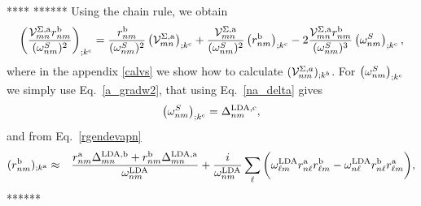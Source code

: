 \documentclass{article}
\begin{document}
****
******
Using the chain rule, we obtain
\begin{eqnarray}\label{chrn1}
\left(
\frac{{\mathbf{\cal V}}^{\Sigma,\mathrm{a}}_{mn}r^{\mathrm{b}}_{nm}}{(\omega^S_{nm})^2}
\right)_{;k^{\mathrm{c}}}
=
\frac{r^{\mathrm{b}}_{nm}}{(\omega^S_{nm})^2}
\left(
{\mathbf{\cal V}} ^{\Sigma,\mathrm{a}}_{mn}
\right)_{;k^{\mathrm{c}}}
+
\frac{{\mathbf{\cal V}}^{\Sigma,\mathrm{a}}_{mn}}{(\omega^S_{nm})^2}
\left(
r^{\mathrm{b}}_{nm}
\right)_{;k^{\mathrm{c}}}
-
2\frac{{\mathbf{\cal V}}^{\Sigma,\mathrm{a}}_{mn}r^{\mathrm{b}}_{nm}}{(\omega^S_{nm})^3}
\left(
\omega^S_{nm}
\right)_{;k^{\mathrm{c}}}
,
\end{eqnarray}
where in the appendix \ref{calvs} 
we show how to calculate $({\mathbf{\cal V}}^{\Sigma,a}_{nm})_{;k^b}$.
For 
$\left(\omega^S_{nm}\right)_{;k^{\mathrm{c}}}$
 we simply use
Eq.~\eqref{a_gradw2}, that using Eq.~\eqref{na_delta} gives
\begin{equation}\label{eli.1}
\left(\omega^S_{nm}\right)_{;k^{\mathrm{c}}}
=\Delta^{\mathrm{LDA},\mathrm{c}}_{nm}
,
\end{equation}
and from Eq.~\eqref{rgendevapn}
\begin{eqnarray}\label{eli.2}
(r^{\mathrm{b}}_{nm})_{;k^{\mathrm{a}}}
&\approx&
\frac{
r^{\mathrm{a}}_{nm}
\Delta^{\mathrm{LDA},\mathrm{b}}_{mn}
+r^{\mathrm{b}}_{nm}
\Delta^{\mathrm{LDA},\mathrm{a}}_{mn}
}
{\omega^{\mathrm{LDA}}_{nm}}
+
\frac{i}{\omega^{\mathrm{LDA}}_{nm}}
\sum_{\ell}
\bigg(
\omega^{\mathrm{LDA}}_{\ell m}
r^{\mathrm{a}}_{n\ell}
r^{\mathrm{b}}_{\ell m}
-
\omega^{\mathrm{LDA}}_{n\ell}
r^{\mathrm{b}}_{n\ell}
r^{\mathrm{a}}_{\ell m}
\bigg)
,
\end{eqnarray}
******
\end{document}
